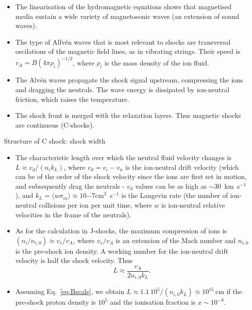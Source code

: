 \begin{frame}{}


\begin{itemize}

\item The linearisation of the hydromagnetic equations shows that
  magnetised media sustain a wide variety of magnetosonic waves (an
  extension of sound waves).

\item The type of Alfv\'en waves that is most relevant to shocks are
  transversal oscilations of the magnetic field lines, as in vibrating
  strings. Their speed is $v_A = B (4 \pi \rho_i)^{-1/2}$, where
  $\rho_i$ is the mass density of the ion fluid. 

\item The Alv\'en waves propagate the shock signal upstream,
  compressing the ions and dragging the neutrals. The wave energy is
  dissipated by ion-neutral friction, which raises the temperature. 

\item The shock front is merged with the relaxation layers. Thus
  magnetic shocks are continuous (C-shocks).

\end{itemize}

\end{frame}





\begin{frame}{Structure of C shock:   shock width}

\begin{itemize}
\item The characteristic length over which the neutral fluid velocity
  changes is $L \approx v_d / (n_i k_L)$, where $v_d = v_i - v_n$ is
  the ion-neutral drift velocity (which can be of the order of the
  shock velocity since the ions are first set in motion, and
  subsequently drag the neutrals - $v_d$ values can be as high as
  $\sim$30~km~s$^{-1}$), and $k_L = \langle w \sigma_{in} \rangle
  \approx 10{-7}$cm$^{3}$~s$^{-1}$ is the Langevin rate (the number of
  ion-neutral collisions per ion per unit time, where $w$ is
  ion-neutral relative velocities in the frame of the neutrals).

\item As for the calculation in J-shocks, the maximum compression of
  ions is $(n_i / n_{i,0}) \approx v_s / v_A $, where $v_s/v_A$ is
  an extension of the Mach number and $n_{i,0}$ is the pre-shock ion
  density. A working number for the ion-neutral drift velocity is half
  the shock velocity.  Thus 
\[ L \approx \frac{v_A }{2 n_{i,0} k_L} .\]

\item Assuming Eq.~\ref{eq:Bscale}, we obtain $L \approx 1.1~10^5 /
  (n_{i,0} k_L) \approx 10^{15}~$cm if the pre-shock proton density is
  $10^5$ and the ionisation fraction is $x \sim 10^{-8}$. 

\end{itemize}

\end{frame}


